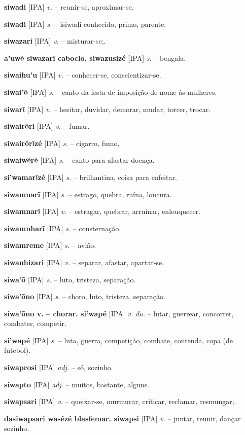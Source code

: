 \textbf{siwadi} [IPA] \textit{v.} -- reunir-se, aproximar-se.

\textbf{siwadi} [IPA] \textit{s.} -- ĩsiwadi conhecido, primo, parente.

\textbf{siwazari} [IPA] \textit{v.} -- misturar-se;.

\textbf{a'uwẽ siwazari caboclo. siwazusizé} [IPA] \textit{s.} -- bengala.

\textbf{siwaihu'u} [IPA] \textit{v.} -- conhecer-se, conscientizar-se.

\textbf{siwai'õ} [IPA] \textit{s.} -- canto da festa de imposição de nome às mulheres.

\textbf{siwarĩ} [IPA] \textit{v.} -- hesitar, duvidar, demorar, mudar, torcer, trocar.

\textbf{siwairõri} [IPA] \textit{v.} -- fumar.

\textbf{siwairõrĩzé} [IPA] \textit{s.} -- cigarro, fumo.

\textbf{siwaiwẽrẽ} [IPA] \textit{s.} -- canto para afastar doença.

\textbf{si'wamarĩzé} [IPA] \textit{s.} -- brilhantina, coisa para enfeitar.

\textbf{siwamnarĩ} [IPA] \textit{s.} -- estrago, quebra, ruína, loucura.

\textbf{siwamnarĩ} [IPA] \textit{v.} -- estragar, quebrar, arruinar, enlouquecer.

\textbf{siwamnharĩ} [IPA] \textit{s.} -- consternação.

\textbf{siwamreme} [IPA] \textit{s.} -- avião.

\textbf{siwanhizari} [IPA] \textit{v.} -- separar, afastar, apartar-se.

\textbf{siwa'õ} [IPA] \textit{s.} -- luto, tristeza, separação.

\textbf{siwa'õno} [IPA] \textit{s.} -- choro, luto, tristeza, separação.

\textbf{siwa'õno v. -- chorar. si'wapé} [IPA] \textit{v. du.} -- lutar, guerrear, concorrer, combater, competir.

\textbf{si'wapé} [IPA] \textit{s.} -- luta, guerra, competição, combate, contenda, copa (de futebol).

\textbf{siwaprosi} [IPA] \textit{adj.} -- só, sozinho.

\textbf{siwapto} [IPA] \textit{adj.} -- muitos, bastante, alguns.

\textbf{siwapsari} [IPA] \textit{v.} -- queixar-se, murmurar, criticar, reclamar, resmungar;.

\textbf{dasiwapsari wasézé blasfemar. siwapsi} [IPA] \textit{v.} -- juntar, reunir, dançar sozinho.

